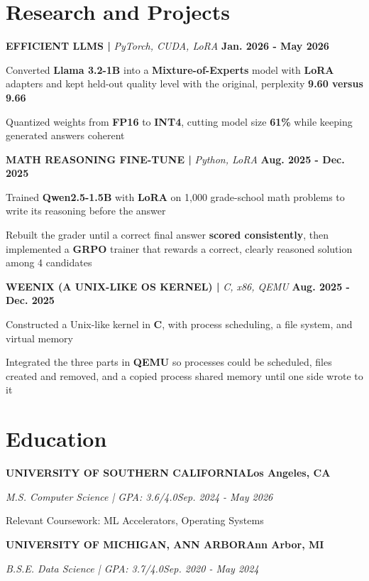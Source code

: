 \documentclass[10pt]{article}
\renewcommand{\note}[1]{#1\par}
\newcommand{\school}[4]{%
  \vspace{2pt}%
  \textbf{\MakeUppercase{#1}}\hfill\textbf{#2}\par
  \vspace{0.5pt}%
  \textit{#3}\hfill\textit{#4}\par
}
\newcommand{\proj}[4]{%
  \vspace{3pt}%
  \textbf{\MakeUppercase{#1} | }\textit{#2}\hfill
  \textbf{#4}%
  \notblank{#3}{\ \textbf{| #3}}{}%
  \par
}
\begin{document}
\section{Research and Projects}
\vspace{-3pt}
\proj{Efficient LLMs}{PyTorch, CUDA, LoRA}{USC}{Jan. 2026 - May 2026}
\begin{bullets}
  \item Converted \textbf{Llama 3.2-1B} into a \textbf{Mixture-of-Experts} model with \textbf{LoRA} adapters and kept held-out quality level with the original, perplexity \textbf{9.60 versus 9.66}
  \item Quantized weights from \textbf{FP16} to \textbf{INT4}, cutting model size \textbf{61\%} while keeping generated answers coherent
\end{bullets}

\proj{Math Reasoning Fine-Tune}{Python, LoRA}{USC}{Aug. 2025 - Dec. 2025}
\begin{bullets}
  \item Trained \textbf{Qwen2.5-1.5B} with \textbf{LoRA} on 1,000 grade-school math problems to write its reasoning before the answer
  \item Rebuilt the grader until a correct final answer \textbf{scored consistently}, then implemented a \textbf{GRPO} trainer that rewards a correct, clearly reasoned solution among 4 candidates
\end{bullets}

\proj{Weenix (A Unix-Like OS Kernel)}{C, x86, QEMU}{USC}{Aug. 2025 - Dec. 2025}
\begin{bullets}
  \item Constructed a Unix-like kernel in \textbf{C}, with process scheduling, a file system, and virtual memory
  \item Integrated the three parts in \textbf{QEMU} so processes could be scheduled, files created and removed, and a copied process shared memory until one side wrote to it
\end{bullets}

\section{Education}
\vspace{-2pt}
\school{University of Southern California}{Los Angeles, CA}{M.S. Computer Science | GPA: 3.6/4.0}{Sep. 2024 - May 2026}
\note{Relevant Coursework: ML Accelerators, Operating Systems}

\school{University of Michigan, Ann Arbor}{Ann Arbor, MI}{B.S.E. Data Science | GPA: 3.7/4.0}{Sep. 2020 - May 2024}
\end{document}
